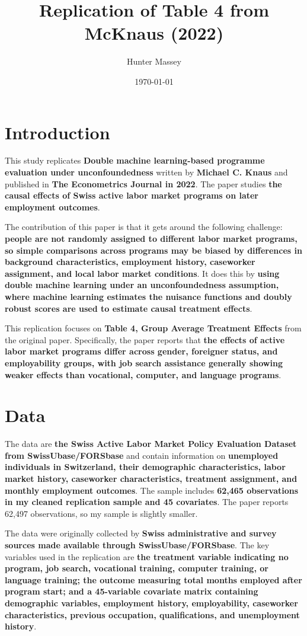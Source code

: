 \documentclass[12pt]{article}
\title{Replication of Table 4 from McKnaus (2022)}
\author{Hunter Massey}
\date{\today}
\begin{document}
\maketitle

\section{Introduction}

This study replicates \textbf{Double machine learning-based programme evaluation under unconfoundedness} written by \textbf{Michael C. Knaus} and published in \textbf{The Econometrics Journal in 2022}. The paper studies \textbf{the causal effects of Swiss active labor market programs on later employment outcomes}.

The contribution of this paper is that it gets around the following challenge: \textbf{people are not randomly assigned to different labor market programs, so simple comparisons across programs may be biased by differences in background characteristics, employment history, caseworker assignment, and local labor market conditions}. It does this by \textbf{using double machine learning under an unconfoundedness assumption, where machine learning estimates the nuisance functions and doubly robust scores are used to estimate causal treatment effects}.

This replication focuses on \textbf{Table 4, Group Average Treatment Effects} from the original paper. Specifically, the paper reports that \textbf{the effects of active labor market programs differ across gender, foreigner status, and employability groups, with job search assistance generally showing weaker effects than vocational, computer, and language programs}.

\section{Data}

The data are \textbf{the Swiss Active Labor Market Policy Evaluation Dataset from SwissUbase/FORSbase} and contain information on \textbf{unemployed individuals in Switzerland, their demographic characteristics, labor market history, caseworker characteristics, treatment assignment, and monthly employment outcomes}. The sample includes \textbf{62,465 observations in my cleaned replication sample and 45 covariates}. The paper reports 62,497 observations, so my sample is slightly smaller.

The data were originally collected by \textbf{Swiss administrative and survey sources made available through SwissUbase/FORSbase}. The key variables used in the replication are \textbf{the treatment variable indicating no program, job search, vocational training, computer training, or language training; the outcome measuring total months employed after program start; and a 45-variable covariate matrix containing demographic variables, employment history, employability, caseworker characteristics, previous occupation, qualifications, and unemployment history}.
\end{document}
